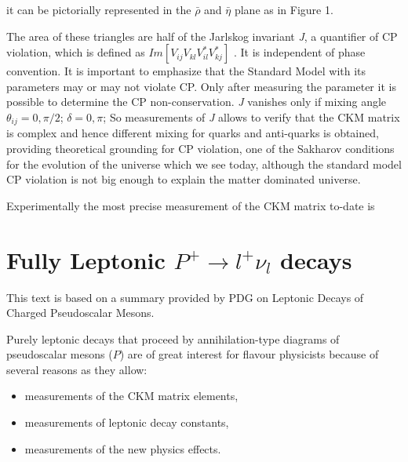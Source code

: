   it can be pictorially represented \cite{ewconstraint} in the $\bar{\rho}$ and $\bar{\eta}$ plane as in Figure 1.

The area of these triangles are half of the Jarlskog invariant \textit{J}, a quantifier of CP violation, which is defined as $ Im[V_{ij}V_{kl}V^*_{il}V^*_{kj}]$ \cite{jarsklog}. It is independent of phase convention. It is important to emphasize that the Standard Model with its parameters may or may not violate CP. Only after measuring the parameter it is possible to determine the CP non-conservation. \textit{J} vanishes\cite{secondjar} only if mixing angle $\theta_{ij} = 0 , \pi/2$; $\delta =  0 , \pi$; So measurements of \textit{J} allows to verify that the CKM matrix is complex and hence different mixing for quarks and anti-quarks is obtained, providing theoretical grounding for CP violation, one of the Sakharov conditions for the evolution of the universe which we see today, although the standard model CP violation is not big enough to explain the matter dominated universe.

Experimentally the most precise measurement of the CKM matrix\cite{ewconstraint} to-date is 

\section{Fully Leptonic $P^{+}\rightarrow l^{+} \nu_{l}$ decays}
This text is based on a summary provided by PDG on Leptonic Decays of Charged Pseudoscalar Mesons.


Purely leptonic decays that proceed by annihilation-type diagrams of pseudoscalar mesons ($P$) are of great interest for flavour physicists because of several reasons as they allow:
\begin{itemize}
\item measurements of the CKM matrix elements,
\item measurements of leptonic decay constants,
\item measurements of the new physics effects.
\end{itemize}



